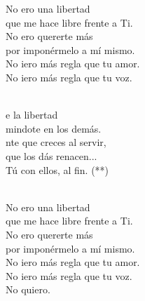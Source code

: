 \documentclass[12pt]{article}
\begin{document}
\begin{multicols*}{2}
\begin{cancion}
	\begin{chorus}%
	No ero una libertad \\
que me hace libre frente a Ti.\\
	No ero quererte más\\
por imponérmelo a mí mismo.\\
	No iero más regla que tu amor.\\
	No iero más regla que tu voz.\\
	\end{chorus}%
	\jump\\
	e la libertad\\
	mindote en los demás.\\
	nte que creces al servir,\\
	que los dás renacen... \\
Tú con ellos, al fin. (**)\\\jump\\
	\begin{chorus}%
	No ero una libertad \\
que me hace libre frente a Ti.\\
	No ero quererte más\\
por imponérmelo a mí mismo.\\
	No iero más regla que tu amor.\\
	No iero más regla que tu voz.\\
	No quiero.\\
	\end{chorus}%
	\jump\\
\end{cancion}%


\end{multicols*}
\end{document}
